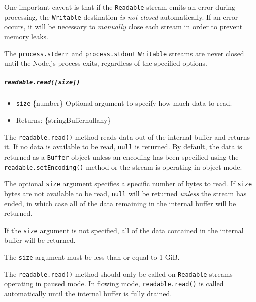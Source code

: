 One important caveat is that if the \texttt{Readable} stream emits an
error during processing, the \texttt{Writable} destination \emph{is not
closed} automatically. If an error occurs, it will be necessary to
\emph{manually} close each stream in order to prevent memory leaks.

The \href{process.md\#processstderr}{\texttt{process.stderr}} and
\href{process.md\#processstdout}{\texttt{process.stdout}}
\texttt{Writable} streams are never closed until the Node.js process
exits, regardless of the specified options.

\subparagraph{\texorpdfstring{\texttt{readable.read({[}size{]})}}{readable.read({[}size{]})}}\label{readable.readsize}

\begin{itemize}
\tightlist
\item
  \texttt{size} \{number\} Optional argument to specify how much data to
  read.
\item
  Returns: \{string\textbar Buffer\textbar null\textbar any\}
\end{itemize}

The \texttt{readable.read()} method reads data out of the internal
buffer and returns it. If no data is available to be read, \texttt{null}
is returned. By default, the data is returned as a \texttt{Buffer}
object unless an encoding has been specified using the
\texttt{readable.setEncoding()} method or the stream is operating in
object mode.

The optional \texttt{size} argument specifies a specific number of bytes
to read. If \texttt{size} bytes are not available to be read,
\texttt{null} will be returned \emph{unless} the stream has ended, in
which case all of the data remaining in the internal buffer will be
returned.

If the \texttt{size} argument is not specified, all of the data
contained in the internal buffer will be returned.

The \texttt{size} argument must be less than or equal to 1 GiB.

The \texttt{readable.read()} method should only be called on
\texttt{Readable} streams operating in paused mode. In flowing mode,
\texttt{readable.read()} is called automatically until the internal
buffer is fully drained.


